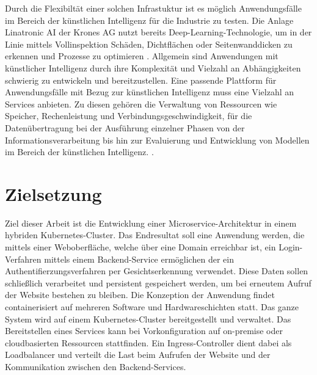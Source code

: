 Durch die Flexibiltät einer solchen Infrastuktur ist es möglich Anwendungsfälle im Bereich
der künstlichen Intelligenz
für die Industrie zu testen. Die Anlage Linatronic AI der Krones AG nutzt bereits Deep-Learning-Technologie,
um in der Linie mittels Vollinspektion Schäden, Dichtflächen oder Seitenwanddicken
zu erkennen und Prozesse zu optimieren \cite{linatronic}. Allgemein sind Anwendungen mit künstlicher Intelligenz durch ihre Komplexität
und Vielzahl an Abhängigkeiten schwierig zu entwickeln und bereitzustellen. 
Eine passende Plattform für Anwendungsfälle mit Bezug zur künstlichen Intelligenz
muss eine Vielzahl an Services anbieten. Zu diesen gehören die Verwaltung von Ressourcen wie Speicher,
Rechenleistung und Verbindungsgeschwindigkeit,
für die Datenübertragung bei der Ausführung einzelner Phasen von der Informationsverarbeitung bis hin zur Evaluierung und Entwicklung von Modellen
im Bereich der künstlichen Intelligenz.
\cite{mlops}. 

\section{Zielsetzung}
Ziel dieser Arbeit ist die Entwicklung einer Microservice-Architektur in einem hybriden Kubernetes-Cluster. 
Das Endresultat soll eine Anwendung werden, die mittels einer Weboberfläche, welche über eine Domain erreichbar ist,
ein Login-Verfahren mittels einem Backend-Service ermöglichen der ein Authentifierzungsverfahren
per Gesichtserkennung verwendet. 
Diese Daten sollen schließlich verarbeitet und persistent 
gespeichert werden, um bei erneutem Aufruf der Website bestehen zu bleiben.
Die Konzeption der Anwendung findet containerisiert auf mehreren Software und Hardwareschichten
statt. 
Das ganze System wird auf einem Kubernetes-Cluster bereitgestellt und verwaltet.
Das Bereitstellen eines Services kann bei Vorkonfiguration auf on-premise oder cloudbasierten Ressourcen stattfinden.
Ein Ingress-Controller dient dabei als Loadbalancer und verteilt die Last beim 
Aufrufen der Website und der Kommunikation zwischen den Backend-Services.

